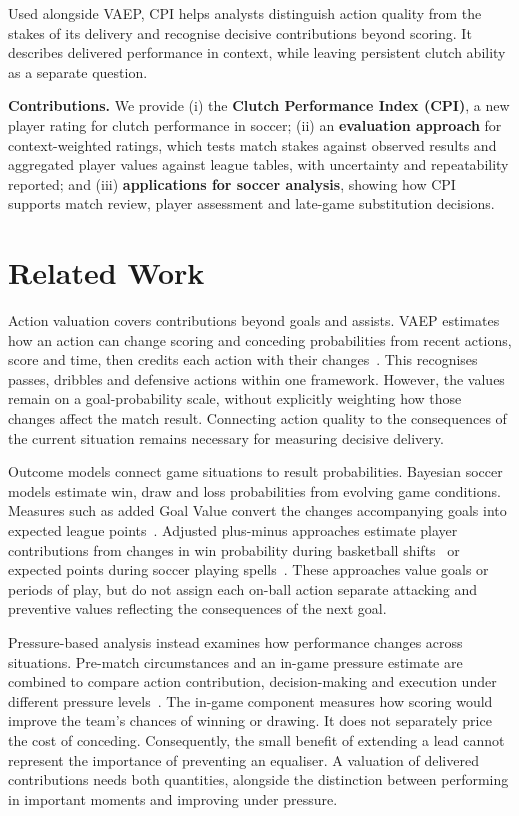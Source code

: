 \documentclass[runningheads]{llncs}
\begin{document}
 Used alongside VAEP, CPI helps analysts distinguish action quality from the stakes of its delivery and recognise decisive contributions beyond scoring. It describes delivered performance in context, while leaving persistent clutch ability as a separate question.

 \noindent\textbf{Contributions.} We provide (i) the \textbf{Clutch Performance Index (CPI)}, a new player rating for clutch performance in soccer; (ii) an \textbf{evaluation approach} for context-weighted ratings, which tests match stakes against observed results and aggregated player values against league tables, with uncertainty and repeatability reported; and (iii) \textbf{applications for soccer analysis}, showing how CPI supports match review, player assessment and late-game substitution decisions.

\section{Related Work}
\label{sec:related}
 Action valuation covers contributions beyond goals and assists. VAEP estimates how an action can change scoring and conceding probabilities from recent actions, score and time, then credits each action with their changes~\cite{decroos2019}. This recognises passes, dribbles and defensive actions within one framework. However, the values remain on a goal-probability scale, without explicitly weighting how those changes affect the match result. Connecting action quality to the consequences of the current situation remains necessary for measuring decisive delivery.

 Outcome models connect game situations to result probabilities. Bayesian soccer models estimate win, draw and loss probabilities from evolving game conditions. Measures such as added Goal Value convert the changes accompanying goals into expected league points~\cite{robberechts2021}. Adjusted plus-minus approaches estimate player contributions from changes in win probability during basketball shifts~\cite{deshpande2016} or expected points during soccer playing spells~\cite{kharrat2020}. These approaches value goals or periods of play, but do not assign each on-ball action separate attacking and preventive values reflecting the consequences of the next goal.

 Pressure-based analysis instead examines how performance changes across situations. Pre-match circumstances and an in-game pressure estimate are combined to compare action contribution, decision-making and execution under different pressure levels~\cite{bransen2019}. The in-game component measures how scoring would improve the team's chances of winning or drawing. It does not separately price the cost of conceding. Consequently, the small benefit of extending a lead cannot represent the importance of preventing an equaliser. A valuation of delivered contributions needs both quantities, alongside the distinction between performing in important moments and improving under pressure.
\end{document}
